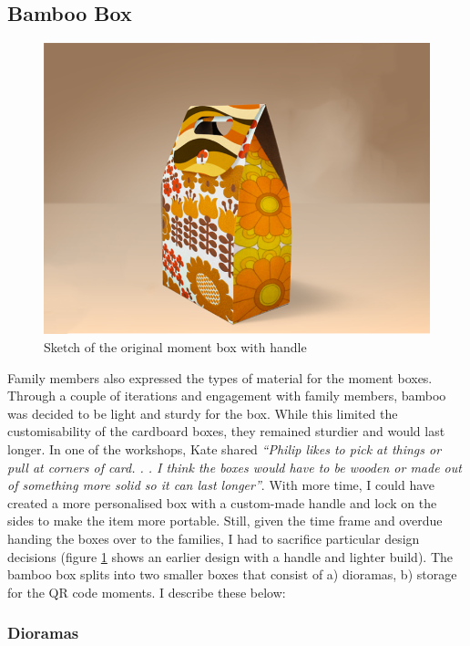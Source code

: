 \subsection{Bamboo Box}
\label{Bamboo box}

\begin{figure}[htp]
\centering
\includegraphics[width=.6\linewidth]{Images/ChapterFour/originalDesign.png}
\caption{Sketch of the original moment box with handle}
\label{fig:oldDesign}
\end{figure}
Family members also expressed the types of material for the moment boxes. Through a couple of iterations and engagement with family members, bamboo was decided to be light and sturdy for the box. While this limited the customisability of the cardboard boxes, they remained sturdier and would last longer. In one of the workshops, Kate shared \textit{``Philip likes to pick at things or pull at corners of card. . . I think the boxes would have to be wooden or made out of something more solid so it can last longer''}. With more time, I could have created a more personalised box with a custom-made handle and lock on the sides to make the item more portable. Still, given the time frame and overdue handing the boxes over to the families, I had to sacrifice particular design decisions (figure \ref{fig:oldDesign} shows an earlier design with a handle and lighter build). The bamboo box splits into two smaller boxes that consist of a) dioramas, b) storage for the QR code moments. I describe these below:

\subsubsection{Dioramas}
\label{Dioramas}

